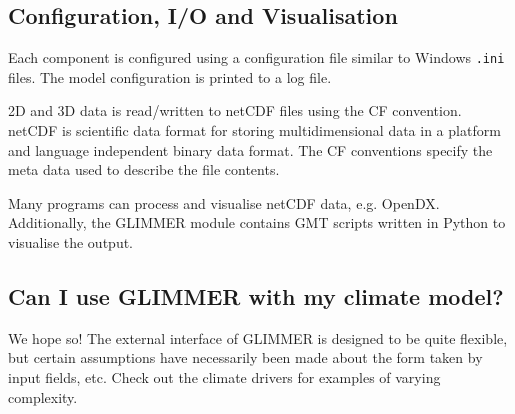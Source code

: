 \subsection{Configuration, I/O and Visualisation}
Each component is configured using a configuration file similar to Windows \texttt{.ini} files. The model configuration is printed to a log file. 

2D and 3D data is read/written to netCDF files using the CF convention. netCDF is scientific data format for storing multidimensional data in a platform and language independent binary data format. The CF conventions specify the meta data used to describe the file contents.

Many programs can process and visualise netCDF data, e.g. OpenDX. Additionally, the GLIMMER module contains GMT scripts written in Python to visualise the output.

\subsection{Can I use GLIMMER with my climate model?}
We hope so! The external interface of GLIMMER is designed to be quite
flexible, but certain assumptions have necessarily been made about the form
taken by input fields, etc. Check out the climate drivers for examples of varying complexity.

